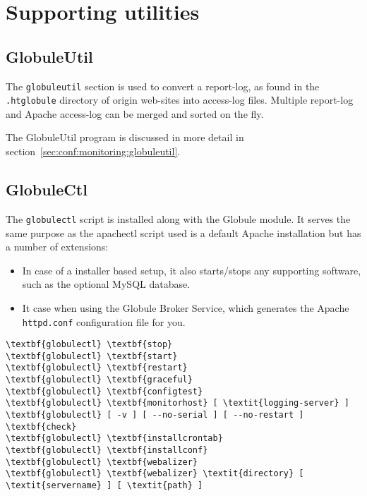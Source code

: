 \documentclass[10pt,a4paper]{article}
\makeatletter
\newenvironment{p}{\@open{P}{}}{\@close{P}}
\newenvironment{p}{}{\par}
\makeatother
\begin{document}

\newpage
\section{Supporting utilities}

\subsection{GlobuleUtil}

\begin{p}
The \verb!globuleutil! section is used to convert a report-log, as found in
the \verb!.htglobule! directory of origin web-sites into access-log files.
Multiple report-log and Apache access-log can be merged and sorted on the fly.
\end{p}

\begin{p}
The GlobuleUtil program is discussed in more detail in
section~\ref{sec:conf:monitoring:globuleutil}.
\end{p}

\subsection{GlobuleCtl}

\begin{p}
The \verb!globulectl! script is installed along with the Globule module.  It
serves the same purpose as the apachectl script used is a default Apache
installation but has a number of extensions:
\end{p}

\begin{p}
\begin{itemize}
\item In case of a installer based setup, it also starts/stops any supporting
software, such as the optional MySQL database.
\item It case when using the Globule Broker Service, which generates the Apache \verb!httpd.conf! configuration file for you.
\end{itemize}
\end{p}

\begin{Verbatim}
\textbf{globulectl} \textbf{stop}
\textbf{globulectl} \textbf{start}
\textbf{globulectl} \textbf{restart}
\textbf{globulectl} \textbf{graceful}
\textbf{globulectl} \textbf{configtest}
\textbf{globulectl} \textbf{monitorhost} [ \textit{logging-server} ]
\textbf{globulectl} [ -v ] [ --no-serial ] [ --no-restart ] \textbf{check}
\textbf{globulectl} \textbf{installcrontab}
\textbf{globulectl} \textbf{installconf}
\textbf{globulectl} \textbf{webalizer}
\textbf{globulectl} \textbf{webalizer} \textit{directory} [ \textit{servername} ] [ \textit{path} ]
\end{Verbatim}
\end{document}
